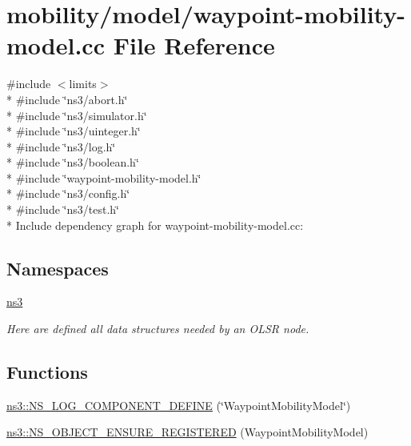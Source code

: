 \hypertarget{waypoint-mobility-model_8cc}{}\section{mobility/model/waypoint-\/mobility-\/model.cc File Reference}
\label{waypoint-mobility-model_8cc}
{\ttfamily \#include $<$limits$>$}\\*
{\ttfamily \#include \char`\"{}ns3/abort.\+h\char`\"{}}\\*
{\ttfamily \#include \char`\"{}ns3/simulator.\+h\char`\"{}}\\*
{\ttfamily \#include \char`\"{}ns3/uinteger.\+h\char`\"{}}\\*
{\ttfamily \#include \char`\"{}ns3/log.\+h\char`\"{}}\\*
{\ttfamily \#include \char`\"{}ns3/boolean.\+h\char`\"{}}\\*
{\ttfamily \#include \char`\"{}waypoint-\/mobility-\/model.\+h\char`\"{}}\\*
{\ttfamily \#include \char`\"{}ns3/config.\+h\char`\"{}}\\*
{\ttfamily \#include \char`\"{}ns3/test.\+h\char`\"{}}\\*
Include dependency graph for waypoint-\/mobility-\/model.cc\+:
\subsection*{Namespaces}
\begin{DoxyCompactItemize}
\item 
 \hyperlink{namespacens3}{ns3}
\begin{DoxyCompactList}\small\item\em Here are defined all data structures needed by an O\+L\+SR node. \end{DoxyCompactList}\end{DoxyCompactItemize}
\subsection*{Functions}
\begin{DoxyCompactItemize}
\item 
\hyperlink{namespacens3_a1ca319557dd88ac38c4971564398e234}{ns3\+::\+N\+S\+\_\+\+L\+O\+G\+\_\+\+C\+O\+M\+P\+O\+N\+E\+N\+T\+\_\+\+D\+E\+F\+I\+NE} (\char`\"{}Waypoint\+Mobility\+Model\char`\"{})
\item 
\hyperlink{namespacens3_adf4bc0c21272eabb8b513f4c7ec21296}{ns3\+::\+N\+S\+\_\+\+O\+B\+J\+E\+C\+T\+\_\+\+E\+N\+S\+U\+R\+E\+\_\+\+R\+E\+G\+I\+S\+T\+E\+R\+ED} (Waypoint\+Mobility\+Model)
\end{DoxyCompactItemize}
